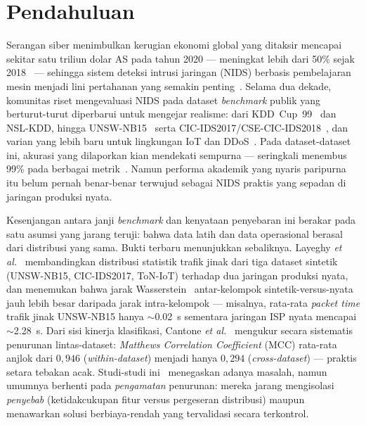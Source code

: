 \documentclass[11pt,a4paper]{article}
\begin{document}
\begin{abstract}
\vspace{0.5em}
\noindent\textbf{Kata kunci:} sistem deteksi intrusi jaringan, generalisasi
lintas-jaringan, pemetaan fitur semantik, adaptasi domain, \emph{few-shot},
validasi trafik nyata\ifadversarial, serangan adversarial adaptif\fi, XGBoost.
\end{abstract}

\section{Pendahuluan}
\label{sec:intro}

Serangan siber menimbulkan kerugian ekonomi global yang ditaksir mencapai
sekitar satu triliun dolar AS pada tahun 2020 --- meningkat lebih dari 50\% sejak
2018~\cite{cremer} --- sehingga sistem deteksi intrusi jaringan (NIDS) berbasis
pembelajaran mesin menjadi lini pertahanan yang semakin penting~\cite{torres,sarker,khraisat,buczak,bhuyan}.
Selama dua
dekade, komunitas riset mengevaluasi NIDS pada dataset \emph{benchmark} publik
yang berturut-turut diperbarui untuk mengejar realisme: dari KDD~Cup~99~\cite{kdd}
dan NSL-KDD, hingga UNSW-NB15~\cite{unsw,unsweval} serta
CIC-IDS2017/CSE-CIC-IDS2018~\cite{cicids}, dan varian yang lebih baru untuk
lingkungan IoT dan DDoS~\cite{botiot,toniot,ciciot,cicddos,ring}. Pada
dataset-dataset ini, akurasi yang
dilaporkan kian mendekati sempurna --- seringkali menembus 99\% pada berbagai
metrik~\cite{layeghy}. Namun performa akademik yang nyaris paripurna itu belum
pernah benar-benar terwujud sebagai NIDS praktis yang sepadan di jaringan
produksi nyata.

Kesenjangan antara janji \emph{benchmark} dan kenyataan penyebaran ini berakar
pada satu asumsi yang jarang teruji: bahwa data latih dan data operasional
berasal dari distribusi yang sama. Bukti terbaru menunjukkan sebaliknya. Layeghy
\emph{et al.}~\cite{layeghy} membandingkan distribusi statistik trafik jinak dari
tiga dataset sintetik (UNSW-NB15, CIC-IDS2017, ToN-IoT) terhadap dua jaringan
produksi nyata, dan menemukan bahwa jarak Wasserstein~\cite{wasserstein}
antar-kelompok
sintetik-versus-nyata jauh lebih besar daripada jarak intra-kelompok ---
misalnya, rata-rata \emph{packet time} trafik jinak UNSW-NB15 hanya
$\sim$\SI{0.02}{\second} sementara jaringan ISP nyata mencapai
$\sim$\SI{2.28}{\second}. Dari sisi kinerja klasifikasi, Cantone
\emph{et al.}~\cite{cantone} mengukur secara sistematis penurunan lintas-dataset:
\emph{Matthews Correlation Coefficient} (MCC) rata-rata anjlok dari $0{,}946$
(\emph{within-dataset}) menjadi hanya $0{,}294$ (\emph{cross-dataset}) --- praktis
setara tebakan acak. Studi-studi ini~\cite{cantone,layeghy,dhooge,verkerken}
menegaskan adanya masalah, namun umumnya berhenti pada \emph{pengamatan}
penurunan: mereka jarang mengisolasi \emph{penyebab} (ketidakcukupan fitur versus
pergeseran distribusi) maupun menawarkan solusi berbiaya-rendah yang tervalidasi
secara terkontrol.
\end{document}
